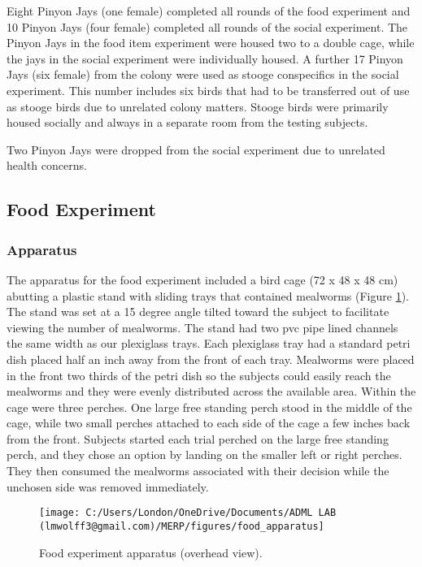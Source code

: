 \documentclass[
  english,
  ,doc,floatsintext]{apa6}
\begin{document}
Eight Pinyon Jays (one female) completed all rounds of the food experiment and 10 Pinyon Jays (four female) completed all rounds of the social experiment. The Pinyon Jays in the food item experiment were housed two to a double cage, while the jays in the social experiment were individually housed. A further 17 Pinyon Jays (six female) from the colony were used as stooge conspecifics in the social experiment. This number includes six birds that had to be transferred out of use as stooge birds due to unrelated colony matters. Stooge birds were primarily housed socially and always in a separate room from the testing subjects.

Two Pinyon Jays were dropped from the social experiment due to unrelated health concerns.

\hypertarget{food-experiment}{%
\subsection{Food Experiment}\label{food-experiment}}

\hypertarget{apparatus}{%
\subsubsection{Apparatus}\label{apparatus}}

The apparatus for the food experiment included a bird cage (72 x 48 x 48 cm) abutting a plastic stand with sliding trays that contained mealworms (Figure \ref{fig:foodapp}). The stand was set at a 15 degree angle tilted toward the subject to facilitate viewing the number of mealworms. The stand had two pvc pipe lined channels the same width as our plexiglass trays. Each plexiglass tray had a standard petri dish placed half an inch away from the front of each tray. Mealworms were placed in the front two thirds of the petri dish so the subjects could easily reach the mealworms and they were evenly distributed across the available area. Within the cage were three perches. One large free standing perch stood in the middle of the cage, while two small perches attached to each side of the cage a few inches back from the front. Subjects started each trial perched on the large free standing perch, and they chose an option by landing on the smaller left or right perches. They then consumed the mealworms associated with their decision while the unchosen side was removed immediately.



\begin{figure}

{\centering \texttt{[image: C:/Users/London/OneDrive/Documents/ADML LAB (lmwolff3@gmail.com)/MERP/figures/food\_apparatus]} 

}

\caption{Food experiment apparatus (overhead view).}\label{fig:foodapp}
\end{figure}
\end{document}
